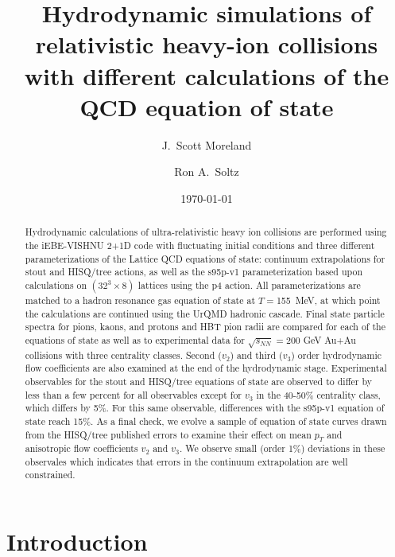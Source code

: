\documentclass[aps,prc,reprint,amsmath,nofootinbib,superscriptaddress]{revtex4-1}
\begin{document}
\title{Hydrodynamic simulations of relativistic heavy-ion collisions\\ with different calculations of the QCD equation of state}

\author{J.\ Scott Moreland}
\author{Ron A.\ Soltz}

\date{\today}

\begin{abstract}
Hydrodynamic calculations of ultra-relativistic heavy ion collisions are performed using the iEBE-VISHNU 2+1D code with fluctuating initial conditions and three different parameterizations of the Lattice QCD equations of state: continuum extrapolations for stout and HISQ/tree actions, as well as the s95p-v1 parameterization based upon calculations on $(32^3 \times 8)$ lattices using the p4 action.  All parameterizations are matched to a hadron resonance gas equation of state at $T=$155~MeV, at which point the calculations are continued using the UrQMD hadronic cascade.  Final state particle spectra for pions, kaons, and protons and HBT pion radii are compared for each of the equations of state as well as to experimental data for $\sqrt{s_{NN}}=200$ GeV Au+Au collisions with three centrality classes.  Second ($v_2$) and third ($v_3$) order hydrodynamic flow coefficients are also examined at the end of the hydrodynamic stage.  Experimental observables for the stout and HISQ/tree equations of state are observed to differ by less than a few percent for all observables except for $v_3$ in the 40-50\% centrality class, which differs by 5\%.  For this same observable, differences with the s95p-v1 equation of state reach 15\%. As a final check, we evolve a sample of equation of state curves drawn from the HISQ/tree published errors to examine their effect on mean $p_T$ and anisotropic flow coefficients $v_2$ and $v_3$. We observe small (order 1\%) deviations in these observales which indicates that errors in the continuum extrapolation are well constrained. 
\end{abstract}

\maketitle

\section{Introduction}
\end{document}
